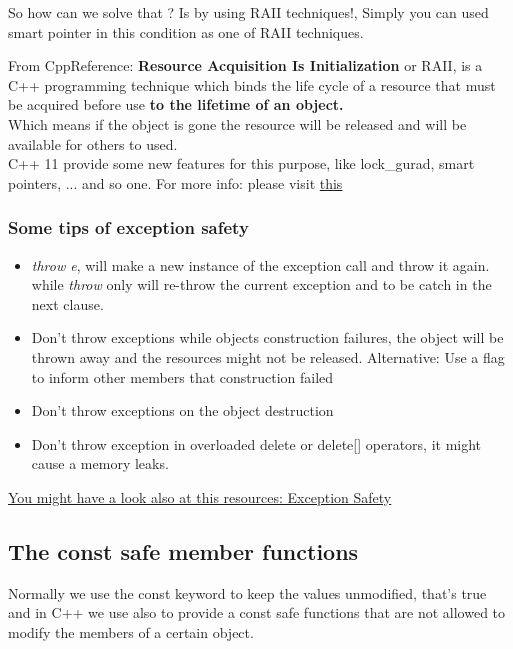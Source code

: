 \documentclass{article}
\begin{document}


So how can we solve that ? Is by using RAII techniques!, Simply you can used smart pointer in this condition as one of RAII techniques.

\begin{mybox}[title={RAII - Mutex that locks itself!}]
From CppReference: \textbf{Resource Acquisition Is Initialization} or RAII, is a C++ programming technique which binds the life cycle of a resource that must be acquired before use \textbf{to the lifetime of an object.}\\
Which means if the object is gone the resource will be released and will be available for others to used.\\



C++ 11 provide some new features for this purpose, like lock\_gurad, smart pointers, ... and so one. For more info: please visit \href{https://en.cppreference.com/w/cpp/language/raii}{this}
\end{mybox}
\subsubsection{Some tips of exception safety}
\begin{itemize}
  \item \textit{throw e}, will make a new instance of the exception call and throw it again.
  while \textit{throw} only will re-throw the current exception and to be catch in the next clause.
  \item Don't throw exceptions while objects construction failures, the object will be thrown away and the resources might not be released.
  Alternative: Use a flag to inform other members that construction failed
  \item Don't throw exceptions on the object destruction
  \item Don't throw exception in overloaded delete or delete[] operators, it might cause a memory leaks.
\end{itemize} 

\href{http://stroustrup.com/except.pdf}{You might have a look also at this resources: Exception Safety }


\subsection{The const safe member functions}
Normally we use the const keyword to keep the values unmodified, that's true and in C++ we use also to provide a const safe functions that are not allowed to modify the members of a certain object.
\end{document}
